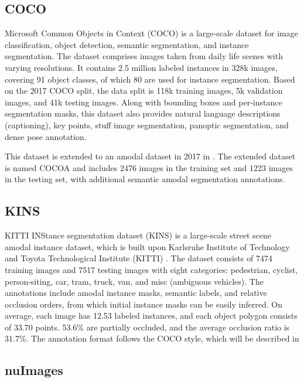 \subsection{COCO}

Microsoft Common Objects in Context (COCO) \cite{lin2014microsoft} is a large-scale dataset for image classification, object detection, semantic segmentation, and instance segmentation. The dataset comprises images taken from daily life scenes with varying resolutions. It contains 2.5 million labeled instances in 328k images, covering 91 object classes, of which 80 are used for instance segmentation. Based on the 2017 COCO split, the data split is 118k training images, 5k validation images, and 41k testing images. Along with bounding boxes and per-instance segmentation masks, this dataset also provides natural language descriptions (captioning), key points, stuff image segmentation, panoptic segmentation, and dense pose annotation.

This dataset is extended to an amodal dataset in 2017 in \cite{cocoa}. The extended dataset is named COCOA and includes 2476 images in the training set and 1223 images in the testing set, with additional semantic amodal segmentation annotations. 

\subsection{KINS}

KITTI INStance segmentation dataset (KINS) \cite{kins} is a large-scale street scene amodal instance dataset, which is built upon Karlsruhe Institute of Technology and Toyota Technological Institute (KITTI)  \cite{kitti}. The dataset consists of 7474 training images and 7517 testing images with eight categories: pedestrian, cyclist, person-siting, car, tram, truck, van, and misc (ambiguous vehicles). The annotations include amodal instance masks, semantic labels, and relative occlusion orders, from which initial instance masks can be easily inferred. On average, each image has 12.53 labeled instances, and each object polygon consists of 33.70 points. 53.6\% are partially occluded, and the average occlusion ratio is 31.7\%. The annotation format follows the COCO style, which will be described in 

\subsection{nuImages} 

